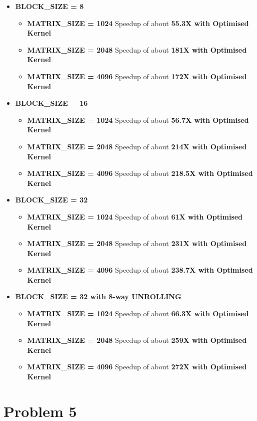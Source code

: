 \documentclass[a4paper]{article}
\begin{document}
\begin{itemize}
\item {\bf BLOCK\_SIZE = 8}
	\begin{itemize}
	\item {\bf MATRIX\_SIZE = 1024} Speedup of about {\bf 55.3X with Optimised Kernel}
	\item {\bf MATRIX\_SIZE = 2048} Speedup of about {\bf 181X with Optimised Kernel}
	\item {\bf MATRIX\_SIZE = 4096} Speedup of about {\bf 172X with Optimised Kernel}
	\end{itemize}
\item {\bf BLOCK\_SIZE = 16}
	\begin{itemize}
	\item {\bf MATRIX\_SIZE = 1024} Speedup of about {\bf 56.7X with Optimised Kernel}
	\item {\bf MATRIX\_SIZE = 2048} Speedup of about  {\bf 214X with Optimised Kernel}
	\item {\bf MATRIX\_SIZE = 4096} Speedup of about {\bf 218.5X with Optimised Kernel}
	\end{itemize}
\item {\bf BLOCK\_SIZE = 32}
	\begin{itemize}
	\item {\bf MATRIX\_SIZE = 1024} Speedup of about {\bf 61X with Optimised Kernel}
	\item {\bf MATRIX\_SIZE = 2048} Speedup of about  {\bf 231X with Optimised Kernel}
	\item {\bf MATRIX\_SIZE = 4096} Speedup of about {\bf 238.7X with Optimised Kernel}
	\end{itemize}
\item {\bf BLOCK\_SIZE = 32 with 8-way UNROLLING}
	\begin{itemize}
	\item {\bf MATRIX\_SIZE = 1024} Speedup of about {\bf 66.3X with Optimised Kernel}
	\item {\bf MATRIX\_SIZE = 2048} Speedup of about  {\bf 259X with Optimised Kernel}
	\item {\bf MATRIX\_SIZE = 4096} Speedup of about {\bf 272X with Optimised Kernel}
	\end{itemize}
\end{itemize}

\newpage

\section{\Huge Problem 5}
\vspace{0.5cm}
\end{document}
